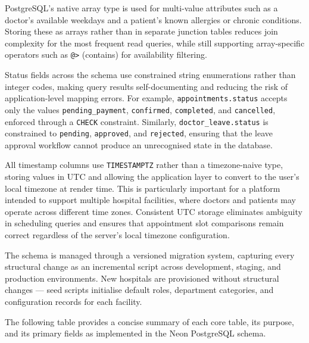 \justifying
\noindent
PostgreSQL's native array type is used for multi-value attributes such as a doctor's
available weekdays and a patient's known allergies or chronic conditions. Storing these
as arrays rather than in separate junction tables reduces join complexity for the most
frequent read queries, while still supporting array-specific operators such as
\texttt{@>} (contains) for availability filtering.

\justifying
\noindent
Status fields across the schema use constrained string enumerations rather than integer
codes, making query results self-documenting and reducing the risk of application-level
mapping errors. For example, \texttt{appointments.status} accepts only the values
\texttt{pending\_payment}, \texttt{confirmed}, \texttt{completed}, and \texttt{cancelled},
enforced through a \texttt{CHECK} constraint. Similarly, \texttt{doctor\_leave.status}
is constrained to \texttt{pending}, \texttt{approved}, and \texttt{rejected}, ensuring
that the leave approval workflow cannot produce an unrecognised state in the database.

\justifying
\noindent
All timestamp columns use \texttt{TIMESTAMPTZ} rather than a timezone-naive type,
storing values in UTC and allowing the application layer to convert to the user's local
timezone at render time. This is particularly important for a platform intended to support
multiple hospital facilities, where doctors and patients may operate across different
time zones. Consistent UTC storage eliminates ambiguity in scheduling queries and ensures
that appointment slot comparisons remain correct regardless of the server's local
timezone configuration.

\justifying
\noindent
The schema is managed through a versioned migration system, capturing every structural
change as an incremental script across development, staging, and production environments.
New hospitals are provisioned without structural changes --- seed scripts initialise default
roles, department categories, and configuration records for each facility.

\noindent
The following table provides a concise summary of each core table, its purpose, and
its primary fields as implemented in the Neon PostgreSQL schema.

